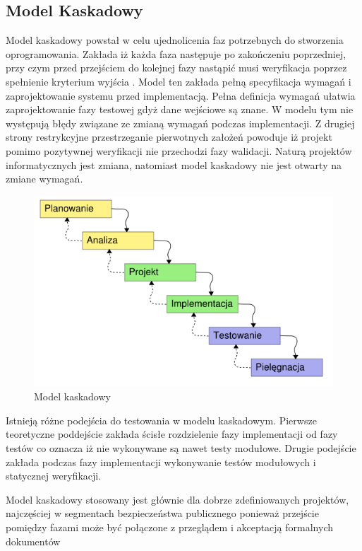 \subsection{Model Kaskadowy}
Model kaskadowy powstał w celu ujednolicenia faz potrzebnych do stworzenia oprogramowania. Zakłada iż każda faza następuje po zakończeniu poprzedniej, przy czym przed przejściem do kolejnej fazy nastąpić musi weryfikacja poprzez spełnienie kryterium wyjścia \cite{SEaT}. Model ten zakłada pełną specyfikacja wymagań i zaprojektowanie systemu przed implementacją. Pełna definicja wymagań ułatwia zaprojektowanie fazy testowej gdyż dane wejściowe są znane. W modelu tym nie występują błędy związane ze zmianą wymagań podczas implementacji. Z drugiej strony restrykcyjne przestrzeganie pierwotnych założeń powoduje iż projekt pomimo pozytywnej weryfikacji nie przechodzi fazy walidacji. Naturą projektów informatycznych jest zmiana, natomiast model kaskadowy nie jest otwarty na zmiane wymagań. 
\begin{figure}[h]
\centerline{\includegraphics[scale=0.5]{img/model_kaskadowy.png}}
\caption{Model kaskadowy}
\label{fig:kaskadowy}
\end{figure}

Istnieją różne podejścia do testowania w modelu kaskadowym. Pierwsze teoretyczne poddejście zakłada ścisłe rozdzielenie fazy implementacji od fazy testów co oznacza iż nie wykonywane są nawet testy modułowe. Drugie podejście zakłada podczas fazy implementacji wykonywanie testów modułowych i statycznej weryfikacji.

Model kaskadowy stosowany jest głównie dla dobrze zdefiniowanych projektów, najczęściej w segmentach bezpieczeństwa publicznego ponieważ przejście pomiędzy fazami może być połączone z przeglądem i akceptacją formalnych dokumentów

